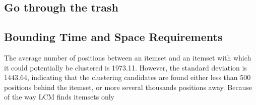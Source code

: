 \documentclass[letterpaper,12pt,titlepage,oneside,final]{book}
\begin{document}
\subsection{Go through the trash}




\subsection{Bounding Time and Space Requirements}
The average number of positions  between an itemset  %
and an itemset with which it could potentially be clustered 
is 1973.11.
However, the standard deviation is 1443.64, 
indicating that the clustering candidates are 
found either %
less than 500 positions behind
the itemset, or more several thousands positions away.
Because of the way LCM finds itemsets
only 
\end{document}
